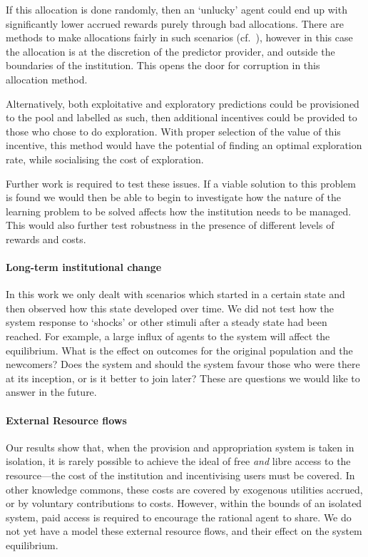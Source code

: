 If this allocation is done randomly, then an `unlucky' agent could end up with
significantly lower accrued rewards purely through bad allocations. There are methods
to make allocations fairly in such scenarios (cf.~\citet{Pitt2014}), however
in this case the allocation is at the discretion of the predictor provider,
and outside the boundaries of the institution. This opens the door for
corruption in this allocation method.

Alternatively, both exploitative and exploratory predictions could be
provisioned to the pool and labelled as such, then additional incentives could
be provided to those who chose to do exploration. With proper selection of the
value of this incentive, this method would have the potential of finding an
optimal exploration rate, while socialising the cost of exploration.

Further work is required to test these issues.
If a viable solution to this problem is found we would then be able
to begin to investigate how the nature of the learning problem to be solved
affects how the institution needs to be managed. This would also further test
robustness in the presence of different levels of rewards and costs.

\paragraph{Long-term institutional change} In this work we only dealt with
scenarios which started in a certain state and then observed how this state
developed over time. We did not test how the system response to `shocks' or
other stimuli after a steady state had been reached. For example, a large
influx of agents to the system will affect the equilibrium. What is the effect
on outcomes for the original population and the newcomers? Does the system and
should the system favour those who were there at its inception, or is it
better to join later? These are questions we would like to answer in the future.

\paragraph{External Resource flows}
Our results show that, when the provision and appropriation system is taken in
isolation, it is rarely possible to achieve the ideal of free \emph{and} libre
access to the resource---the cost of the institution and incentivising users
must be covered. In other knowledge commons, these costs are covered by
exogenous utilities accrued, or by voluntary contributions to costs. However,
within the bounds of an isolated system, paid access is required to encourage the
rational agent to share. We do not yet have a model these external resource
flows, and their effect on the system equilibrium.

